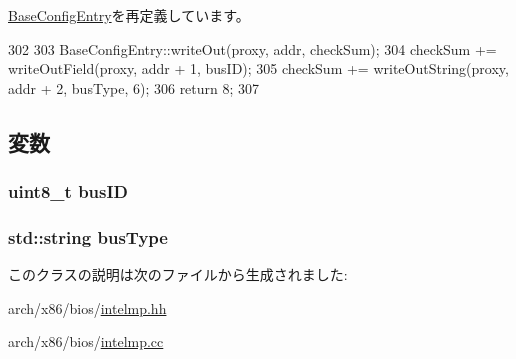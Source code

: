 \hyperlink{classX86ISA_1_1IntelMP_1_1BaseConfigEntry_a5fffc1006b1f28bd779d83ffbe213b4f}{BaseConfigEntry}を再定義しています。


\begin{DoxyCode}
302 {
303     BaseConfigEntry::writeOut(proxy, addr, checkSum);
304     checkSum += writeOutField(proxy, addr + 1, busID);
305     checkSum += writeOutString(proxy, addr + 2, busType, 6);
306     return 8;
307 }
\end{DoxyCode}


\subsection{変数}
\hypertarget{classX86ISA_1_1IntelMP_1_1Bus_ac86b1934f811ad40b20b27d29c52a5d3}{
\subsubsection[{busID}]{\setlength{\rightskip}{0pt plus 5cm}uint8\_\-t {\bf busID}}}
\label{classX86ISA_1_1IntelMP_1_1Bus_ac86b1934f811ad40b20b27d29c52a5d3}
\hypertarget{classX86ISA_1_1IntelMP_1_1Bus_a84ef871bfab300fc3bfff53b4651ccc1}{
\subsubsection[{busType}]{\setlength{\rightskip}{0pt plus 5cm}std::string {\bf busType}}}
\label{classX86ISA_1_1IntelMP_1_1Bus_a84ef871bfab300fc3bfff53b4651ccc1}


このクラスの説明は次のファイルから生成されました:\begin{DoxyCompactItemize}
\item 
arch/x86/bios/\hyperlink{intelmp_8hh}{intelmp.hh}\item 
arch/x86/bios/\hyperlink{intelmp_8cc}{intelmp.cc}\end{DoxyCompactItemize}
